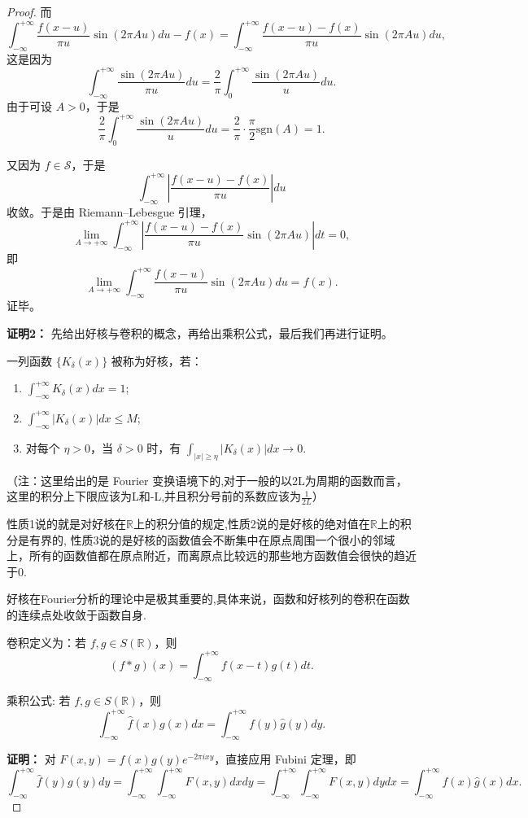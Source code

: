 \documentclass[12pt]{ctexart}  %
\begin{document}
\begin{proof}
而
\[
\int_{-\infty}^{+\infty} \frac{f(x-u)}{\pi u} \sin(2\pi A u) du - f(x)
= \int_{-\infty}^{+\infty} \frac{f(x-u) - f(x)}{\pi u} \sin(2\pi A u) du,
\]
这是因为
\[
\int_{-\infty}^{+\infty} \frac{\sin(2\pi A u)}{\pi u} du
= \frac{2}{\pi} \int_{0}^{+\infty} \frac{\sin(2\pi A u)}{u} du.
\]
由于可设 \(A>0\)，于是
\[
\frac{2}{\pi} \int_{0}^{+\infty} \frac{\sin(2\pi A u)}{u} du
= \frac{2}{\pi} \cdot \frac{\pi}{2} \text{sgn}(A) = 1.
\]

又因为 \(f \in \mathcal{S}\)，于是
\[
\int_{-\infty}^{+\infty} \left| \frac{f(x-u) - f(x)}{\pi u} \right| du
\]
收敛。于是由 Riemann–Lebesgue 引理，
\[
\lim_{A\to+\infty} \int_{-\infty}^{+\infty} \left| \frac{f(x-u) - f(x)}{\pi u} \sin(2\pi A u) \right| dt = 0,
\]
即
\[
\lim_{A\to+\infty} \int_{-\infty}^{+\infty} \frac{f(x-u)}{\pi u} \sin(2\pi A u) du = f(x).
\]
证毕。

\vspace{1em}
\noindent \textbf{证明2：} 先给出好核与卷积的概念，再给出乘积公式，最后我们再进行证明。

一列函数 \(\{K_\delta(x)\}\) 被称为好核，若：
\begin{enumerate}
    \item \(\displaystyle \int_{-\infty}^{+\infty} K_\delta(x) dx = 1\);
    \item \(\displaystyle \int_{-\infty}^{+\infty} |K_\delta(x)| dx \le M\);
    \item 对每个 \(\eta>0\)，当 \(\delta>0\) 时，有 \(\displaystyle \int_{|x|\ge\eta} |K_\delta(x)| dx \to 0\).
\end{enumerate}

（注：这里给出的是 Fourier 变换语境下的,对于一般的以2L为周期的函数而言，这里的积分上下限应该为L和-L,并且积分号前的系数应该为$\frac{1}{2L}$）

性质1说的就是对好核在$\mathbb{R}$上的积分值的规定,性质2说的是好核的绝对值在$\mathbb{R}$上的积分是有界的,
性质3说的是好核的函数值会不断集中在原点周围一个很小的邻域上，所有的函数值都在原点附近，而离原点比较远的那些地方函数值会很快的趋近于0.

好核在Fourier分析的理论中是极其重要的,具体来说，函数和好核列的卷积在函数的连续点处收敛于函数自身.

卷积定义为：若 \(f,g \in S(\mathbb{R})\)，则
\[
(f*g)(x) = \int_{-\infty}^{+\infty} f(x-t) g(t) dt.
\]

乘积公式: 若 \(f,g \in S(\mathbb{R})\)，则
\[
\int_{-\infty}^{+\infty} \hat{f}(x) g(x) dx = \int_{-\infty}^{+\infty} f(y) \hat{g}(y) dy.
\]

\noindent \textbf{证明：} 对 \(F(x,y) = f(x) g(y) e^{-2\pi i x y}\)，直接应用 Fubini 定理，即
\[
 \int_{-\infty}^{+\infty} \hat{f}(y) g(y) dy
=\int_{-\infty}^{+\infty} \int_{-\infty}^{+\infty} F(x,y) dx dy
= \int_{-\infty}^{+\infty} \int_{-\infty}^{+\infty} F(x,y) dy dx
= \int_{-\infty}^{+\infty} f(x) \hat{g}(x) dx.
\]


\end{proof}
\end{document}
